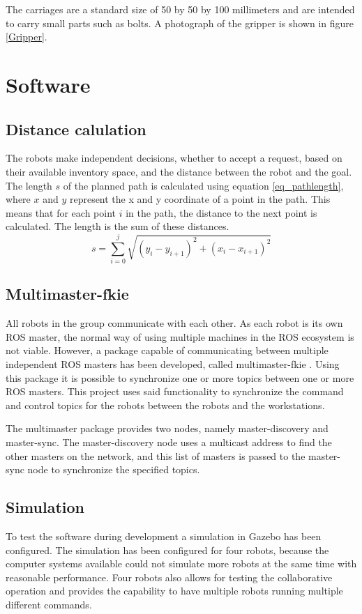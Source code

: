 \documentclass[10pt, journal]{IEEEtran}
\begin{document}
The carriages are a standard size of 50 by 50 by 100 millimeters and are intended to carry small parts such as bolts. A photograph of the gripper is shown in figure \ref{Gripper}.

\section{Software}

\subsection{Distance calulation}
The robots make independent decisions, whether to accept a request, based on their available inventory space, and the distance between the robot and the goal. The length $s$ of the planned path is calculated using equation \ref{eq_pathlength}, where $x$ and $y$ represent the x and y coordinate of a point in the path. This means that for each point $i$ in the path, the distance to the next point is calculated. The length is the sum of these distances.
\begin{equation}
\label{eq_pathlength}
s= \sum\limits_{i=0}^j \sqrt{(y_i - y_{i+1})^2 + (x_i - x_{i+1})^2}
\end{equation}

\subsection{Multimaster-fkie}
All robots in the group communicate with each other. As each robot is its own ROS master, the normal way of using multiple machines \cite{ROSMultipleMachines} in the ROS ecosystem is not viable. However, a package capable of communicating between multiple independent ROS masters has been developed, called multimaster-fkie \cite{Multimaster-fkie}. Using this package it is possible to synchronize one or more topics between one or more ROS masters. This project uses said functionality to synchronize the command and control topics for the robots between the robots and the workstations.

The multimaster package provides two nodes, namely master-discovery and master-sync. The master-discovery node uses a multicast address to find the other masters on the network, and this list of masters is passed to the master-sync node to synchronize the specified topics.
\subsection{Simulation}
To test the software during development a simulation in Gazebo\cite{Gazebo} has been configured\cite{MultipleRobots}. The simulation has been configured for four robots, because the computer systems available could not simulate more robots at the same time with reasonable performance. Four robots also allows for testing the collaborative operation and provides the capability to have multiple robots running multiple different commands.
\end{document}

